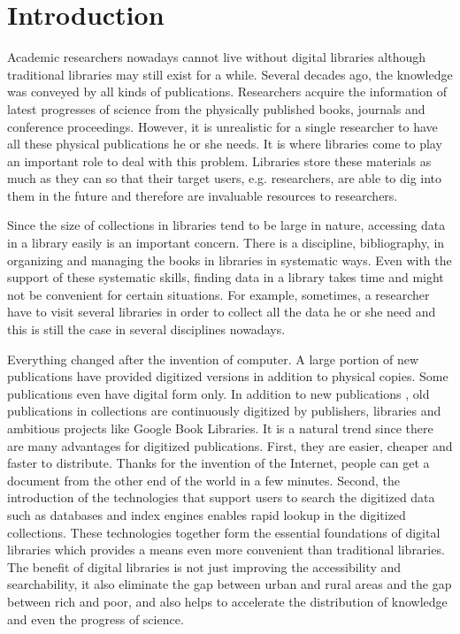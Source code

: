 \documentclass[prodmode]{acmsmall} %
\begin{document}
\section{Introduction}

Academic researchers nowadays cannot live without digital libraries although traditional libraries may still exist for a while. Several decades ago, the knowledge was conveyed by all kinds of publications. Researchers acquire the information of latest progresses of science from the physically published books, journals and conference proceedings. However, it is unrealistic for a single researcher to have all these physical publications he or she needs. It is where libraries come to play an important role to deal with this problem. Libraries store these materials as much as they can so that their target users, e.g. researchers, are able to dig into them in the future and therefore are invaluable resources to researchers.

Since the size of collections in libraries tend to be large in nature, accessing data in a library easily is an important concern. There is a discipline, bibliography, in organizing and managing the books in libraries in systematic ways. Even with the support of these systematic skills, finding data in a library takes time and might not be convenient for certain situations. For example, sometimes, a researcher have to visit several libraries in order to collect all the data he or she need and this is still the case in several disciplines nowadays.

Everything changed after the invention of computer. A large portion of new publications have provided digitized versions in addition to physical copies. Some publications even have digital form only. In addition to new publications , old publications in collections are continuously digitized by publishers, libraries and ambitious projects like Google Book Libraries. It is a natural trend since there are many advantages for digitized publications. First, they are easier, cheaper and faster to distribute. Thanks for the invention of the Internet, people can get a document from the other end of the world in a few minutes. Second, the introduction of the technologies that support users to search the digitized data such as databases and index engines enables rapid lookup in the digitized collections. These technologies together form the essential foundations of digital libraries which provides a means even more convenient than traditional libraries. The benefit of digital libraries is not just improving the accessibility and searchability, it also eliminate the gap between urban and rural areas and the gap between rich and poor, and also helps to accelerate the distribution of knowledge and even the progress of science.
\end{document}
